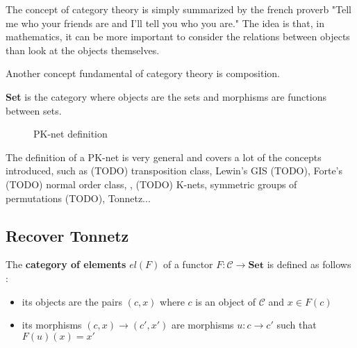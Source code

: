 \documentclass{report}
\begin{document}
The concept of category theory is simply summarized by the french proverb "Tell me who your friends are and I'll tell you who you are." The idea is that, in mathematics, it can be more important to consider the relations between objects than look at the objects themselves. 

Another concept fundamental of category theory is composition. 


\begin{defn}\textbf{Set} is the category where objects are the sets and morphisms are functions between sets.\end{defn}


\begin{figure}[ht]
    \centering
    \caption{PK-net definition}
\end{figure}

The definition of a PK-net is very general and covers a lot of the concepts introduced, such as (TODO) transposition class, Lewin's GIS (TODO), Forte's (TODO) normal order class, , (TODO) K-nets, symmetric groups of permutations (TODO), Tonnetz...




\subsection{Recover Tonnetz}


\begin{defn} The \textbf{category of elements} $el(F)$ of a functor $F : \mathcal{C}\rightarrow \textbf{Set}$ is defined as follows :
    \begin{itemize}
        \item its objects are the pairs $(c,x)$ where $c$ is an object of $\mathcal{C}$ and $x\in F(c)$
        \item its morphisms $(c,x)\rightarrow (c',x')$ are morphisms $u : c\rightarrow c'$ such that $F(u)(x) = x'$
    \end{itemize}
\end{defn}
\end{document}
